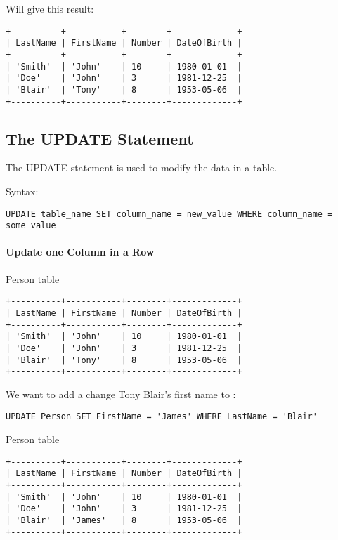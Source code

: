 \documentclass{howto}
\begin{document}

Will give this result:

\begin{verbatim}
+----------+-----------+--------+-------------+
| LastName | FirstName | Number | DateOfBirth |
+----------+-----------+--------+-------------+
| 'Smith'  | 'John'    | 10     | 1980-01-01  |
| 'Doe'    | 'John'    | 3      | 1981-12-25  |
| 'Blair'  | 'Tony'    | 8      | 1953-05-06  |
+----------+-----------+--------+-------------+
\end{verbatim}


\subsection{The UPDATE Statement}

The UPDATE statement is used to modify the data in a table.

Syntax:
\begin{verbatim}
UPDATE table_name SET column_name = new_value WHERE column_name = some_value
\end{verbatim}

\paragraph{Update one Column in a Row}

Person table
\begin{verbatim}
+----------+-----------+--------+-------------+
| LastName | FirstName | Number | DateOfBirth |
+----------+-----------+--------+-------------+
| 'Smith'  | 'John'    | 10     | 1980-01-01  |
| 'Doe'    | 'John'    | 3      | 1981-12-25  |
| 'Blair'  | 'Tony'    | 8      | 1953-05-06  |
+----------+-----------+--------+-------------+
\end{verbatim}

We want to add a change Tony Blair's first name to :

\begin{verbatim}
UPDATE Person SET FirstName = 'James' WHERE LastName = 'Blair'
\end{verbatim}

Person table
\begin{verbatim}
+----------+-----------+--------+-------------+
| LastName | FirstName | Number | DateOfBirth |
+----------+-----------+--------+-------------+
| 'Smith'  | 'John'    | 10     | 1980-01-01  |
| 'Doe'    | 'John'    | 3      | 1981-12-25  |
| 'Blair'  | 'James'   | 8      | 1953-05-06  |
+----------+-----------+--------+-------------+
\end{verbatim}
\end{document}
